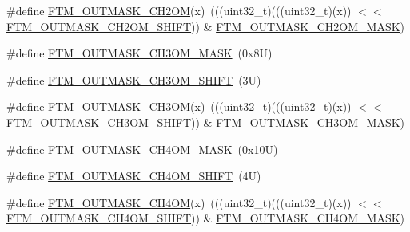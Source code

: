 \begin{DoxyCompactItemize}
\item 
\#define \mbox{\hyperlink{group___f_t_m___register___masks_ga19377c45f3a5b49254f07c83999066c2}{F\+T\+M\+\_\+\+O\+U\+T\+M\+A\+S\+K\+\_\+\+C\+H2\+OM}}(x)~(((uint32\+\_\+t)(((uint32\+\_\+t)(x)) $<$$<$ \mbox{\hyperlink{group___f_t_m___register___masks_ga9dca78158dd0cbc591569935f052bab4}{F\+T\+M\+\_\+\+O\+U\+T\+M\+A\+S\+K\+\_\+\+C\+H2\+O\+M\+\_\+\+S\+H\+I\+FT}})) \& \mbox{\hyperlink{group___f_t_m___register___masks_gabcfafbb8acba84e561a6023f966991c8}{F\+T\+M\+\_\+\+O\+U\+T\+M\+A\+S\+K\+\_\+\+C\+H2\+O\+M\+\_\+\+M\+A\+SK}})
\item 
\#define \mbox{\hyperlink{group___f_t_m___register___masks_gae6021cca5706f19ca601ca8d020c4903}{F\+T\+M\+\_\+\+O\+U\+T\+M\+A\+S\+K\+\_\+\+C\+H3\+O\+M\+\_\+\+M\+A\+SK}}~(0x8\+U)
\item 
\#define \mbox{\hyperlink{group___f_t_m___register___masks_gaeb20c19e85755256c8336c06d5602852}{F\+T\+M\+\_\+\+O\+U\+T\+M\+A\+S\+K\+\_\+\+C\+H3\+O\+M\+\_\+\+S\+H\+I\+FT}}~(3\+U)
\item 
\#define \mbox{\hyperlink{group___f_t_m___register___masks_ga9a801dba69df9ee28748b333a8d472a6}{F\+T\+M\+\_\+\+O\+U\+T\+M\+A\+S\+K\+\_\+\+C\+H3\+OM}}(x)~(((uint32\+\_\+t)(((uint32\+\_\+t)(x)) $<$$<$ \mbox{\hyperlink{group___f_t_m___register___masks_gaeb20c19e85755256c8336c06d5602852}{F\+T\+M\+\_\+\+O\+U\+T\+M\+A\+S\+K\+\_\+\+C\+H3\+O\+M\+\_\+\+S\+H\+I\+FT}})) \& \mbox{\hyperlink{group___f_t_m___register___masks_gae6021cca5706f19ca601ca8d020c4903}{F\+T\+M\+\_\+\+O\+U\+T\+M\+A\+S\+K\+\_\+\+C\+H3\+O\+M\+\_\+\+M\+A\+SK}})
\item 
\#define \mbox{\hyperlink{group___f_t_m___register___masks_ga89efa7258ffb29d1477ca5d7dc9ae870}{F\+T\+M\+\_\+\+O\+U\+T\+M\+A\+S\+K\+\_\+\+C\+H4\+O\+M\+\_\+\+M\+A\+SK}}~(0x10\+U)
\item 
\#define \mbox{\hyperlink{group___f_t_m___register___masks_gacb820bca5f610439c9259fcbf80a75d8}{F\+T\+M\+\_\+\+O\+U\+T\+M\+A\+S\+K\+\_\+\+C\+H4\+O\+M\+\_\+\+S\+H\+I\+FT}}~(4\+U)
\item 
\#define \mbox{\hyperlink{group___f_t_m___register___masks_ga3c90f751e1f18470abe07398a9d826e9}{F\+T\+M\+\_\+\+O\+U\+T\+M\+A\+S\+K\+\_\+\+C\+H4\+OM}}(x)~(((uint32\+\_\+t)(((uint32\+\_\+t)(x)) $<$$<$ \mbox{\hyperlink{group___f_t_m___register___masks_gacb820bca5f610439c9259fcbf80a75d8}{F\+T\+M\+\_\+\+O\+U\+T\+M\+A\+S\+K\+\_\+\+C\+H4\+O\+M\+\_\+\+S\+H\+I\+FT}})) \& \mbox{\hyperlink{group___f_t_m___register___masks_ga89efa7258ffb29d1477ca5d7dc9ae870}{F\+T\+M\+\_\+\+O\+U\+T\+M\+A\+S\+K\+\_\+\+C\+H4\+O\+M\+\_\+\+M\+A\+SK}})
$$
\end{DoxyCompactItemize}
